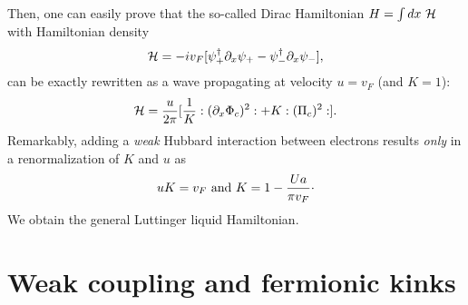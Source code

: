 Then, one can easily prove
that the so-called Dirac Hamiltonian $H=\int dx\ {\cal H}$ with
Hamiltonian density
\begin{equation}
{\cal H}=-iv_F[\psi_+^{\dag}\partial_x \psi_+ - 
\psi_-^{\dag}\partial_x \psi_-],
\end{equation}
can be exactly rewritten as a wave propagating at velocity $u=v_F$
(and $K=1$):
\begin{equation}
{\cal H}=\frac{u}{2\pi}[\frac{1}{K}:(\partial_x\Phi_c)^2:+K:(\Pi_c)^2:].
\end{equation}
Remarkably, adding a {\it weak}
Hubbard interaction between electrons results {\it only} in a renormalization
of $K$ and $u$ as
\begin{equation}
uK=v_F\ \hbox{and}\ K=1-\frac{Ua}{\pi v_F}\cdot
\end{equation}
We obtain the general Luttinger liquid Hamiltonian.

\section{Weak coupling and fermionic kinks}

